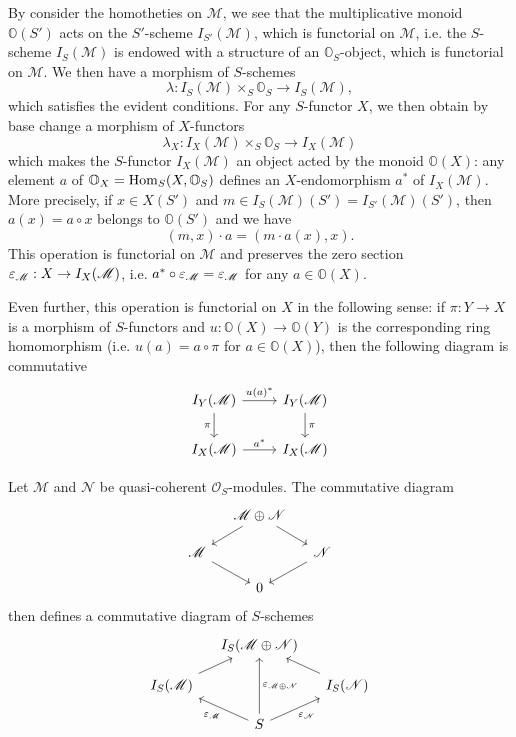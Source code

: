 \begin{remark}\label{scheme tangent bundle I_S action of O(S)}
By consider the homotheties on $\mathscr{M}$, we see that the multiplicative monoid $\mathbb{O}(S')$ acts on the $S'$-scheme $I_{S'}(\mathscr{M})$, which is functorial on $\mathscr{M}$, i.e. the $S$-scheme $I_S(\mathscr{M})$ is endowed with a structure of an $\mathbb{O}_S$-object, which is functorial on $\mathscr{M}$. We then have a morphism of $S$-schemes
\[\lambda:I_S(\mathscr{M})\times_S\mathbb{O}_S\to I_S(\mathscr{M}),\]
which satisfies the evident conditions. For any $S$-functor $X$, we then obtain by base change a morphism of $X$-functors
\[\lambda_X:I_X(\mathscr{M})\times_S\mathbb{O}_S\to I_X(\mathscr{M})\]
which makes the $S$-functor $I_X(\mathscr{M})$ an object acted by the monoid $\mathbb{O}(X)$: any element $a$ of $\mathbb{O}_X=\mathrm{Hom}_S(X,\mathbb{O}_S)$ defines an $X$-endomorphism $a^*$ of $I_X(\mathscr{M})$. More precisely, if $x\in X(S')$ and $m\in I_S(\mathscr{M})(S')=I_{S'}(\mathscr{M})(S')$, then $a(x)=a\circ x$ belongs to $\mathbb{O}(S')$ and we have
\[(m,x)\cdot a=(m\cdot a(x),x).\]
This operation is functorial on $\mathscr{M}$ and preserves the zero section $\varepsilon_\mathscr{M}:X\to I_X(\mathscr{M})$, i.e. $a^*\circ\varepsilon_\mathscr{M}=\varepsilon_\mathscr{M}$ for any $a\in\mathbb{O}(X)$.\par
Even further, this operation is functorial on $X$ in the following sense: if $\pi:Y\to X$ is a morphism of $S$-functors and $u:\mathbb{O}(X)\to\mathbb{O}(Y)$ is the corresponding ring homomorphism (i.e. $u(a)=a\circ\pi$ for $a\in\mathbb{O}(X)$), then the following diagram is commutative
\[\begin{tikzcd}
I_Y(\mathscr{M})\ar[r,"u(a)^*"]\ar[d,swap,"\pi"]&I_Y(\mathscr{M})\ar[d,"\pi"]\\
I_X(\mathscr{M})\ar[r,"a^*"]&I_X(\mathscr{M})
\end{tikzcd}\]
\end{remark}

Let $\mathscr{M}$ and $\mathscr{N}$ be quasi-coherent $\mathscr{O}_S$-modules. The commutative diagram
\[\begin{tikzcd}[row sep=4mm,column sep=4mm]
&\mathscr{M}\oplus\mathscr{N}\ar[ld]\ar[rd]&\\
\mathscr{M}\ar[rd]&&\mathscr{N}\ar[ld]\\
&0&
\end{tikzcd}\]
then defines a commutative diagram of $S$-schemes
\begin{equation}\label{scheme dual number of direct sum Cartesian diagram-1}
\begin{tikzcd}[row sep=4mm,column sep=4mm]
&I_S(\mathscr{M}\oplus\mathscr{N})&\\
I_S(\mathscr{M})\ar[ru]&&I_S(\mathscr{N})\ar[lu]\\
&S\ar[ru,swap,"\eps_\mathscr{N}"]\ar[lu,"\eps_\mathscr{M}"]\ar[uu,swap,"\eps_{\mathscr{M}\oplus\mathscr{N}}"]&
\end{tikzcd}
\end{equation}

